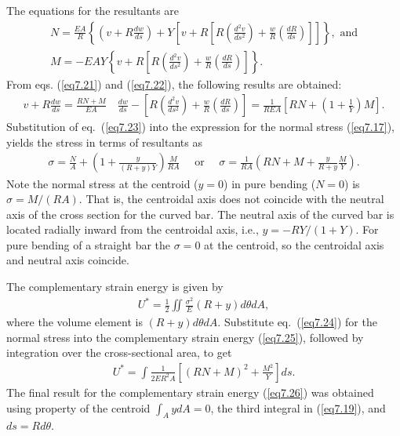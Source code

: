 \documentclass{AeroStructure-ERJohnson}
\begin{document}
\vspace*{-\baselineskip}
\noindent The equations for the resultants are\vspace*{-3pt}
\begin{gather}\label{eq7.21}
N=\frac{E A}{R}\left\{\left(v+R \frac{d w}{d s}\right)+Y\left[v+R\left[R\left(\frac{d^{2} v}{d s^{2}}\right)+\frac{w}{R}\left(\frac{d R}{d s}\right)\right]\right]\right\}, \textrm{ and} \\
M=-E A Y\left\{v+R\left[R\left(\frac{d^{2} v}{d s^{2}}\right)+\frac{w}{R}\left(\frac{d R}{d s}\right)\right]\right\}. \label{eq7.22}
\end{gather}
From eqs. (\ref{eq7.21}) and (\ref{eq7.22}), the following results are obtained:
\begin{align}\label{eq7.23}
v+R \frac{d w}{d s}=\frac{R N+M}{E A} \quad \frac{d w}{d s}-\left[R\left(\frac{d^{2} v}{d s^{2}}\right)+\frac{w}{R}\left(\frac{d R}{d s}\right)\right]=\frac{1}{R E A}\left[R N+\left(1+\frac{1}{Y}\right) M\right].
\end{align}
Substitution of eq.~(\ref{eq7.23}) into the expression for the normal stress (\ref{eq7.17}), yields the stress in terms of resultants as
\begin{align}\label{eq7.24}
\sigma=\frac{N}{A}+\left(1+\frac{y}{(R+y) Y}\right) \frac{M}{R A} \quad \text { or } \quad \sigma=\frac{1}{R A}\left(R N+M+\frac{y}{R+y} \frac{M}{Y}\right).
\end{align}
Note the normal stress at the centroid ($y= 0$) in pure bending ($N=0$) is $\sigma=M /(R A)$. That is, the centroidal axis does not coincide with the neutral axis of the cross section for the curved bar. The neutral axis of the curved bar is located radially inward from the centroidal axis, i.e., $y=-R Y /(1+Y)$. For pure bending of a straight bar the $\sigma=0$ at the centroid, so the centroidal axis and neutral axis coincide.

The complementary strain energy is given by
\begin{align}\label{eq7.25}
U^{*}=\frac{1}{2} \iint \frac{\sigma^{2}}{E}(R+y) d \theta d A,
\end{align}
where the volume element is $(R+y) d \theta d A$. Substitute eq.~(\ref{eq7.24}) for the normal stress into the complementary strain energy (\ref{eq7.25}), followed by integration over the cross-sectional area, to get
\begin{align}\label{eq7.26}
U^{*}=\int \frac{1}{2 E R^{2} A}\left[(R N+M)^{2}+\frac{M^{2}}{Y}\right] d s.
\end{align}
The final result for the complementary strain energy (\ref{eq7.26}) was obtained using property of the centroid $\int_{A} y d A=0$, the third integral in (\ref{eq7.19}), and $d s=R d \theta$.
\end{document}
